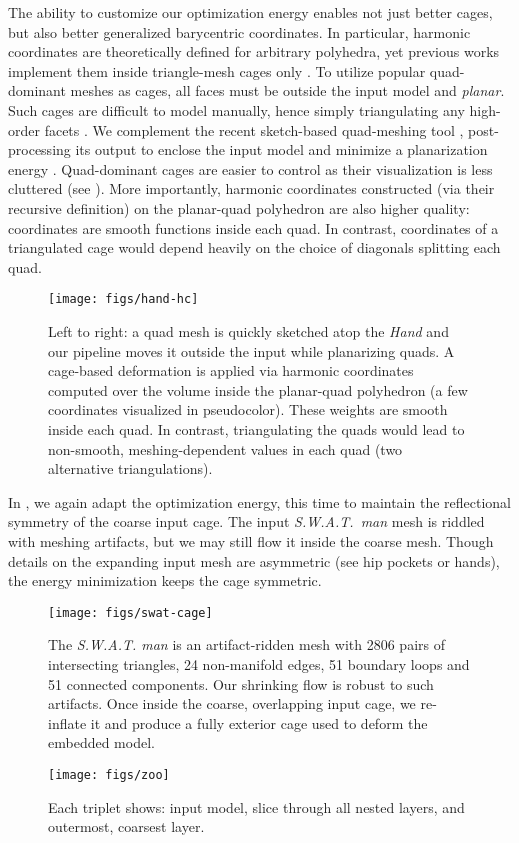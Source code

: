 The ability to customize our optimization energy enables not just better cages,
but also better generalized barycentric coordinates. In particular, harmonic
coordinates are theoretically defined for arbitrary polyhedra, yet previous
works implement them inside triangle-mesh cages only
\cite{HarmonicCoodinates07}.
%
To utilize popular quad-dominant meshes as cages, all faces must be outside the
input model and \emph{planar}.
%
Such cages are difficult to model manually, hence simply triangulating any
high-order facets \cite{HarmonicCoodinates07}.
%
We complement the recent sketch-based quad-meshing tool \cite{Takayama:2013},
post-processing its output to enclose the input model and minimize a
planarization energy \cite{poranne2013interactive}.
%
Quad-dominant cages are easier to control as their visualization is less
cluttered (see ).
%
More importantly, harmonic coordinates constructed (via their recursive
definition) on the planar-quad polyhedron are also higher quality: coordinates
are smooth functions inside each quad.
%
In contrast, coordinates of a triangulated cage would depend heavily on the
choice of diagonals splitting each quad.

\begin{figure}
  \texttt{[image: figs/hand-hc]}
  \caption{Left to right: a quad mesh is quickly sketched atop the \emph{Hand}
  and our pipeline moves it outside the input while planarizing quads. A
  cage-based deformation is applied via harmonic coordinates computed over the
  volume inside the planar-quad polyhedron (a few coordinates visualized in
  pseudocolor). These weights are smooth inside each quad. In contrast,
  triangulating the quads would lead to non-smooth, meshing-dependent values in
  each quad (two alternative triangulations).}
  \label{fig:hand-hc}
\end{figure}

In , we again adapt the optimization energy, this time to
maintain the reflectional symmetry of the coarse input cage.
%
The input \emph{S.W.A.T.\ man} mesh is riddled with meshing artifacts, but we
may still flow it inside the coarse mesh.
%
Though details on the expanding input mesh are asymmetric (see hip pockets or
hands), the energy minimization keeps the cage symmetric.

\begin{figure}
  \texttt{[image: figs/swat-cage]}
  \caption{The \emph{S.W.A.T. man} is an artifact-ridden mesh with 2806 pairs
  of intersecting triangles, 24 non-manifold edges, 51 boundary loops and 51
  connected components. Our shrinking flow is robust to such artifacts. Once
  inside the coarse, overlapping input cage, we re-inflate it and produce a
  fully exterior cage used to deform the embedded model.}
  \label{fig:swat-cage}
\end{figure}

\begin{figure*}
  \texttt{[image: figs/zoo]}
  \caption{Each triplet shows: input model, slice through all nested
  layers, and outermost, coarsest layer.}
  \label{fig:zoo}
\end{figure*}
